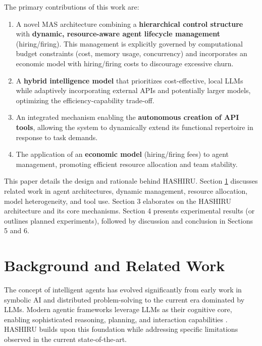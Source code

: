 \documentclass[conference]{IEEEtran}
\begin{document}
The primary contributions of this work are:
\begin{enumerate}
    \item A novel MAS architecture combining a \textbf{hierarchical control structure} with \textbf{dynamic, resource-aware agent lifecycle management} (hiring/firing). This management is explicitly governed by computational budget constraints (cost, memory usage, concurrency) and incorporates an economic model with hiring/firing costs to discourage excessive churn.
    \item A \textbf{hybrid intelligence model} that prioritizes cost-effective, local LLMs while adaptively incorporating external APIs and potentially larger models, optimizing the efficiency-capability trade-off.
    \item An integrated mechanism enabling the \textbf{autonomous creation of API tools}, allowing the system to dynamically extend its functional repertoire in response to task demands.
    \item The application of an \textbf{economic model} (hiring/firing fees) to agent management, promoting efficient resource allocation and team stability.
\end{enumerate}

This paper details the design and rationale behind HASHIRU. Section \ref{sec:background} discusses related work in agent architectures, dynamic management, resource allocation, model heterogeneity, and tool use. Section 3 elaborates on the HASHIRU architecture and its core mechanisms. Section 4 presents experimental results (or outlines planned experiments), followed by discussion and conclusion in Sections 5 and 6.

\section{Background and Related Work} \label{sec:background}

The concept of intelligent agents has evolved significantly from early work in symbolic AI and distributed problem-solving \cite{russell2010artificial, shoham1994agent} to the current era dominated by LLMs. Modern agentic frameworks leverage LLMs as their cognitive core, enabling sophisticated reasoning, planning, and interaction capabilities \cite{wang2023survey, xi2023rise}. HASHIRU builds upon this foundation while addressing specific limitations observed in the current state-of-the-art.
\end{document}
